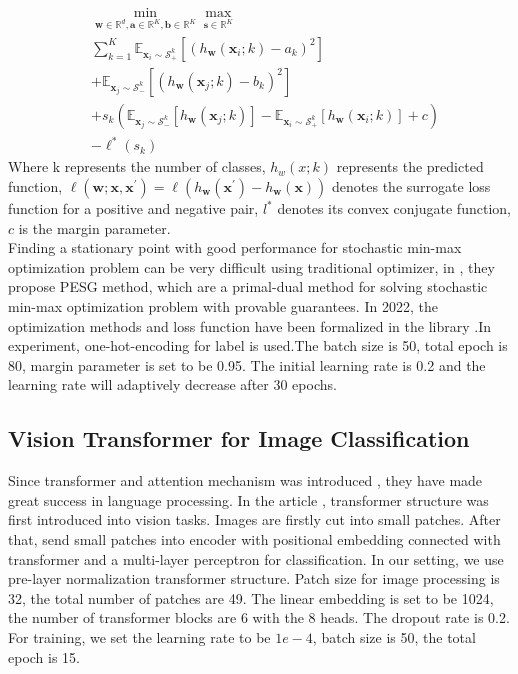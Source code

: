 \documentclass[10pt,twocolumn,letterpaper]{article}
\begin{document}
\begin{align*}
&\min _{\mathbf{w} \in \mathbb{R}^d, \mathbf{a} \in \mathbb{R}^K, \mathbf{b} \in \mathbb{R}^K} \max _{\mathbf{s} \in \mathbb{R}^K} \\ 
&\sum_{k=1}^K \mathbb{E}_{\mathbf{x}_i \sim \mathcal{S}_{+}^k}\left[\left(h_{\mathbf{w}}\left(\mathbf{x}_i ; 
k\right)-a_k\right)^2\right] \\
&+\mathbb{E}_{\mathbf{x}_j \sim \mathcal{S}_{-}^k}\left[\left(h_{\mathbf{w}}\left(\mathbf{x}_j ; k\right)-b_k\right)^2\right] \\
&+s_k\left(\mathbb{E}_{\mathbf{x}_j \sim \mathcal{S}_{-}^k}\left[h_{\mathbf{w}}\left(\mathbf{x}_j ; k\right)\right]-\mathbb{E}_{\mathbf{x}_i \sim \mathcal{S}_{+}^k}\left[h_{\mathbf{w}}\left(\mathbf{x}_i ; k\right)\right] +c\right) \\
& -\ell^*\left(s_k\right)
\end{align*}
Where k represents the number of classes, $h_w(x;k)$ represents the predicted function, $\ell\left(\mathbf{w} ; \mathbf{x}, \mathbf{x}^{\prime}\right)=\ell\left(h_{\mathbf{w}}\left(\mathbf{x}^{\prime}\right)-h_{\mathbf{w}}(\mathbf{x})\right)$ denotes the surrogate loss function for a positive and negative pair, $l^*$ denotes its convex conjugate function, $c$ is the margin parameter.\\
Finding a stationary point with good performance for stochastic min-max optimization problem can be very difficult using traditional optimizer, in \cite{DBLP:journals/corr/abs-2012-03173}, they propose PESG method, which are a primal-dual method for solving stochastic min-max optimization problem with provable guarantees. In 2022, the optimization methods and loss function have been formalized in the library \cite{libauc2022}.In experiment, one-hot-encoding for label is used.The batch size is 50, total epoch is 80, margin parameter is set to be 0.95. The initial learning rate is 0.2 and the learning rate will adaptively decrease after 30 epochs.

\subsection{ Vision Transformer for Image Classification}
Since transformer and attention mechanism \cite{DBLP:journals/corr/VaswaniSPUJGKP17} was introduced , they have made great success in language processing. In the article \cite{DBLP:journals/corr/abs-2010-11929}, transformer structure was first introduced into vision tasks. Images are firstly cut into small patches. After that, send small patches into encoder with positional embedding connected with transformer and a multi-layer perceptron for classification. In our setting, we use pre-layer normalization transformer structure. Patch size for image processing is 32, the total number of patches are 49. The linear embedding is set to be 1024, the number of transformer blocks are 6 with the 8 heads. The dropout rate is 0.2.
For training, we set the learning rate to be $1e-4$, batch size is 50, the total epoch is 15.
\end{document}
